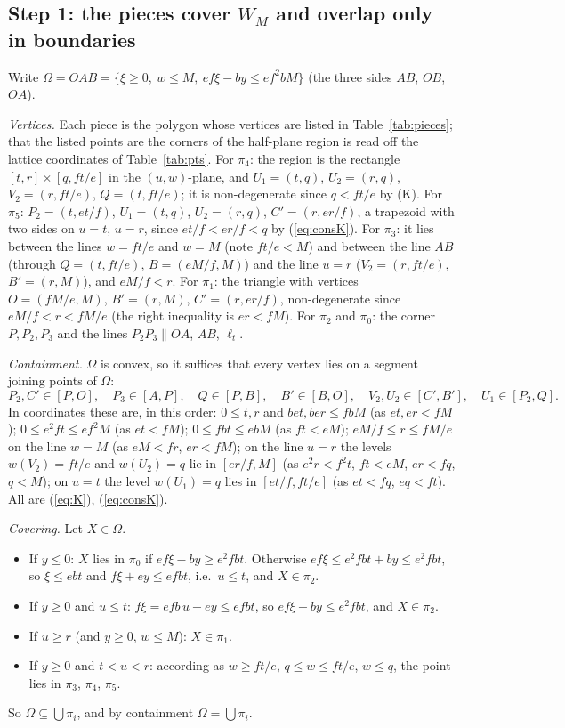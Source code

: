 \documentclass[11pt,reqno]{amsart}
\theoremstyle{plain}
\theoremstyle{definition}
\begin{document}
\subsection{Step 1: the pieces cover $W_M$ and overlap only in boundaries}\label{sub:cover}
Write $\Omega=OAB=\{\xi\ge0,\ w\le M,\ ef\xi-by\le ef^2bM\}$ (the three sides $AB$, $OB$, $OA$).

\emph{Vertices.} Each piece is the polygon whose vertices are listed in Table~\ref{tab:pieces}; that the listed points are the corners of the half-plane region is read off the lattice coordinates of Table~\ref{tab:pts}. For $\pi_4$: the region is the rectangle $[t,r]\times[q,ft/e]$ in the $(u,w)$-plane, and $U_1=(t,q)$, $U_2=(r,q)$, $V_2=(r,ft/e)$, $Q=(t,ft/e)$; it is non-degenerate since $q<ft/e$ by (K). For $\pi_5$: $P_2=(t,et/f)$, $U_1=(t,q)$, $U_2=(r,q)$, $C'=(r,er/f)$, a trapezoid with two sides on $u=t$, $u=r$, since $et/f<er/f<q$ by (\ref{eq:consK}). For $\pi_3$: it lies between the lines $w=ft/e$ and $w=M$ (note $ft/e<M$) and between the line $AB$ (through $Q=(t,ft/e)$, $B=(eM/f,M)$) and the line $u=r$ ($V_2=(r,ft/e)$, $B'=(r,M)$), and $eM/f<r$. For $\pi_1$: the triangle with vertices $O=(fM/e,M)$, $B'=(r,M)$, $C'=(r,er/f)$, non-degenerate since $eM/f<r<fM/e$ (the right inequality is $er<fM$). For $\pi_2$ and $\pi_0$: the corner $P,P_2,P_3$ and the lines $P_2P_3\parallel OA$, $AB$, $\ell_t$.

\emph{Containment.} $\Omega$ is convex, so it suffices that every vertex lies on a segment joining points of $\Omega$:
\[
P_2,C'\in[P,O],\quad P_3\in[A,P],\quad Q\in[P,B],\quad B'\in[B,O],\quad V_2,U_2\in[C',B'],\quad U_1\in[P_2,Q].
\]
In coordinates these are, in this order: $0\le t,r$ and $bet,ber\le fbM$ (as $et,er<fM$); $0\le e^2ft\le ef^2M$ (as $et<fM$); $0\le fbt\le ebM$ (as $ft<eM$); $eM/f\le r\le fM/e$ on the line $w=M$ (as $eM<fr$, $er<fM$); on the line $u=r$ the levels $w(V_2)=ft/e$ and $w(U_2)=q$ lie in $[er/f,M]$ (as $e^2r<f^2t$, $ft<eM$, $er<fq$, $q<M$); on $u=t$ the level $w(U_1)=q$ lies in $[et/f,ft/e]$ (as $et<fq$, $eq<ft$). All are (\ref{eq:K}), (\ref{eq:consK}).

\emph{Covering.} Let $X\in\Omega$.
\begin{itemize}\itemsep1pt
\item If $y\le0$: $X$ lies in $\pi_0$ if $ef\xi-by\ge e^2fbt$. Otherwise $ef\xi\le e^2fbt+by\le e^2fbt$, so $\xi\le ebt$ and $f\xi+ey\le efbt$, i.e.\ $u\le t$, and $X\in\pi_2$.
\item If $y\ge0$ and $u\le t$: $f\xi=efb\,u-ey\le efbt$, so $ef\xi-by\le e^2fbt$, and $X\in\pi_2$.
\item If $u\ge r$ (and $y\ge0$, $w\le M$): $X\in\pi_1$.
\item If $y\ge0$ and $t<u<r$: according as $w\ge ft/e$, $q\le w\le ft/e$, $w\le q$, the point lies in $\pi_3$, $\pi_4$, $\pi_5$.
\end{itemize}
So $\Omega\subseteq\bigcup\pi_i$, and by containment $\Omega=\bigcup\pi_i$.
\end{document}
